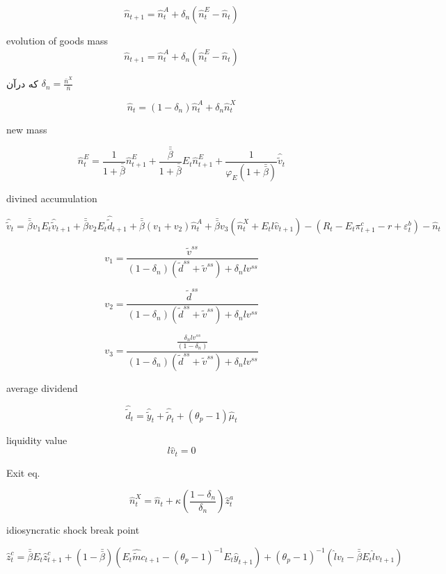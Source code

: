\documentclass[11pt]{article}
\author{Entrance}
\title{}
\begin{document}
\[
{\hat n_{t + 1}} = \hat n_t^A + {\delta _n}({\hat n_t^E - {{\hat n}_t}})
\]

evolution of goods mass
\[
{\hat n_{t + 1}} = \hat n_t^A + {\delta _n}\left( {\hat n_t^E - {{\hat n}_t}}
\right)
\]


{\raggedright
که درآن ${\delta _n} = \frac{{{{\bar n}^X}}}{{\bar n}}$
}


\[
{\hat n_t} = \left( {1 - {\delta _n}} \right)\hat n_t^A + {\delta _n}\hat n_t^X
\]

new mass 

\[
\hat n_t^E = \frac{1}{{1 + \bar \bar \beta }}\hat n_{t + 1}^E + \frac{{\bar \bar
\beta }}{{1 + \bar \bar \beta }}{E_t}\hat n_{t + 1}^E + \frac{1}{{{\varphi _E}(1
+ \bar \bar \beta )}}{\hat \tilde v_t}
\]


divined accumulation

\[
{\hat \tilde v_t} = \bar \bar \beta {v_1}{E_t}{\hat \tilde v_{t + 1}} + \bar
\bar \beta {v_2}{E_t}{\hat \tilde d_{t + 1}} + \bar \bar \beta ({v_1} +
{v_2})\hat n_t^A + \bar \bar \beta {v_3}\left( {\hat n_t^X + {E_t}l{{\hat v}_{t +
1}}} \right) - \left( {{R_t} - {E_t}\pi _{t + 1}^c - r + \varepsilon _t^b}
\right) - {\hat n_t}
\]



\[
{v_1} = \frac{{{{\tilde v}^{ss}}}}{{\left( {1 - {\delta _n}} \right)\left(
{{{\tilde d}^{ss}} + {{\tilde v}^{ss}}} \right) + {\delta _n}l{v^{ss}}}}
\]



\[
{v_2} = \frac{{{{\tilde d}^{ss}}}}{{\left( {1 - {\delta _n}} \right)\left(
{{{\tilde d}^{ss}} + {{\tilde v}^{ss}}} \right) + {\delta _n}l{v^{ss}}}}
\]



\[
{v_3} = \frac{{\frac{{{\delta _n}l{v^{ss}}}}{{\left( {1 - {\delta _n}}
\right)}}}}{{\left( {1 - {\delta _n}} \right)\left( {{{\tilde d}^{ss}} + {{\tilde
v}^{ss}}} \right) + {\delta _n}l{v^{ss}}}}
\]


average dividend


\[
{\hat \tilde d_t} = {\hat \tilde y_t} + {\hat \tilde \rho _t} + ({\theta _p} -
1){\hat \mu _t}
\]


liquidity value
\[
l{\hat v_t} = 0
\]


Exit eq.

\[
\hat n_t^X = {\hat n_t} + \kappa \left( {\frac{{1 - {\delta _n}}}{{{\delta
_n}}}} \right)\hat z_t^a
\]


idiosyncratic shock break point


\[
\hat z_t^c = \bar \bar \beta {E_t}\hat z_{t + 1}^c + (1 - \bar \bar \beta
)\left( {{E_t}\hat \tilde m{c_{t + 1}} - {{({\theta _p} - 1)}^{ - 1}}{E_t}{{\hat
y}_{t + 1}}} \right) + {({\theta _p} - 1)^{ - 1}}\left( {\hat l{v_t} - \bar \bar
\beta {E_t}\hat l{v_{t + 1}}} \right)
\]
\end{document}
